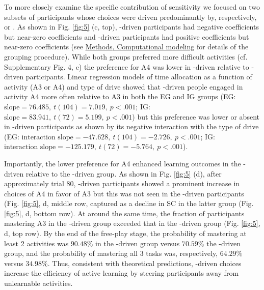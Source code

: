     To more closely examine the specific contribution of {\LP} sensitivity we focused on two subsets of participants whose choices were driven predominantly by, respectively, {\PC} or {\LP}. As shown in Fig. \ref{fig:5} (c, top), {\PC}-driven participants had negative {\PC} coefficients but near-zero {\LP} coefficients and {\LP}-driven participants had positive {\LP} coefficients but near-zero {\PC} coefficients (see \hyperref[subsubsec:methods/analysis/modeling]{Methods, Computational modeling} for details of the grouping procedure). While both groups preferred more difficult activities (cf. Supplementary Fig. 4, c) the preference for A4 was lower in {\LP}-driven relative to {\PC}-driven participants. Linear regression models of time allocation as a function of activity (A3 or A4) and type of drive showed that {\PC}-driven people engaged in activity A4 more often relative to A3 in both the EG and IG groups (EG: $\text{slope} = 76.485,\ t(104) = 7.019,\ p < .001$; IG: $\text{slope} = 83.941,\ t(72) = 5.199,\ p < .001$) but this preference was lower or absent in {\LP}-driven participants as shown by its negative interaction with the type of drive (EG: $\text{interaction slope} = -47.628,\ t(104) = -2.726,\ p < .001$; IG: $\text{interaction slope} = -125.179,\ t(72) = -5.764,\ p < .001$).
    
    Importantly, the lower preference for A4 enhanced learning outcomes in the {\LP}-driven relative to the {\PC}-driven group. As shown in Fig. \ref{fig:5} (d), after approximately trial 80, {\PC}-driven participants showed a prominent increase in choices of A4 in favor of A3 but this was not seen in the {\LP}-driven participants (Fig. \ref{fig:5}, d, middle row, captured as a decline in SC in the latter group (Fig. \ref{fig:5}, d, bottom row). At around the same time, the fraction of participants mastering A3 in the {\LP}-driven group exceeded that in the {\PC}-driven group (Fig. \ref{fig:5}, d, top row). By the end of the free-play stage, the probability of mastering at least 2 activities was $90.48\%$ in the {\LP}-driven group versus $70.59\%$ the {\PC}-driven group, and the  probability of mastering all 3 tasks was, respectively, $64.29\%$ versus $34.98\%$. Thus, consistent with theoretical predictions, {\LP}-driven choices increase the efficiency of active learning by steering participants away from unlearnable activities.

